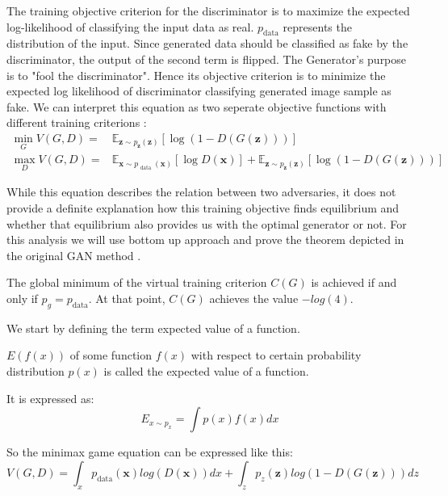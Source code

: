 The training objective criterion for the discriminator is to maximize the expected log-likelihood of
classifying the input data as real. $p_{\text{data}}$ represents the distribution of the input.
Since generated data should be classified as fake by the discriminator, the output of the second
term is flipped. The Generator's purpose is to "fool the discriminator". Hence its objective criterion
is to minimize the expected log likelihood of discriminator classifying generated image sample as
fake. We can interpret this equation as two seperate objective functions with different training
criterions :
\begin{align}
    \min _{G} V(G, D)=& \mathbb{E}_{\boldsymbol{z} \sim p_{\boldsymbol{z}}(\boldsymbol{z})}[\log (1-D(G(\boldsymbol{z})))] \\[5pt]
    \max _{D} V(G, D)=& \mathbb{E}_{\boldsymbol{x} \sim p_{\text { data }}(\boldsymbol{x})}[\log D(\boldsymbol{x})]+\mathbb{E}_{\boldsymbol{z} \sim p_{\boldsymbol{z}}(\boldsymbol{z})}[\log (1-D(G(\boldsymbol{z})))]
\end{align}

While this equation describes the relation between two adversaries, it does not provide a
definite explanation how this training objective finds equilibrium and whether that equilibrium also
provides us with the optimal generator or not. For this analysis we will use bottom up approach and
prove the theorem depicted in the original GAN method \cite{Goodfellow:2014:GAN:2969033.2969125}.

\begin{theorem}
\label{thr:gan}
The global minimum of the virtual training criterion $C(G)$ is achieved if and only if $p_g = p_{\text{data}}$.
At that point, $C(G)$ achieves the value $-log(4)$.
\end{theorem} 
We start by defining the term expected value of a function. 

\begin{definition}
    $E(f(x))$ of some function $f(x)$ with respect to  certain probability distribution
$p(x)$ is called the expected value of a function.  
\end{definition}

It is expressed as:
\begin{equation}
    \label{eqn:ev}
    E_{x \sim p_x} = \int p(x) f(x) dx
\end{equation}

So the minimax game equation can be expressed like this: 
\begin{equation}
    \label{eqn:minmax_gan}
    V( G, D) = \int_x p_{\text{data}}(\boldsymbol{x}) log(D(\boldsymbol{x})) dx + \int_z p_z(\boldsymbol{z}) log(1 - D(G(\boldsymbol{z}))) dz
\end{equation}
    
